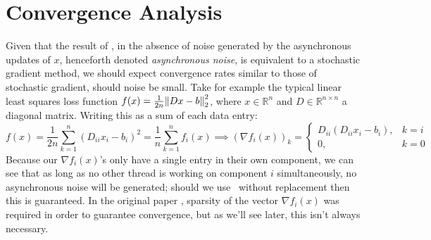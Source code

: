 \section{Convergence Analysis}

Given that the result of \hogwild, in the absence of noise generated by the
asynchronous updates of $x$, henceforth denoted {\it asynchronous noise}, is
equivalent to a stochastic gradient method, we should expect convergence rates
similar to those of stochastic gradient, should noise be small. Take for example
the typical linear least squares loss function $f(x) = \frac{1}{2n}
\norm{Dx-b}_2^2$, where $x \in \mathbb{R}^n$ and $D \in \mathbb{R}^{n \times n}$
a diagonal matrix. Writing this as a sum of each data entry:
\[
  f(x) 
  = \frac{1}{2n} \sum_{k=1}^n (D_{ii}x_i - b_i)^2
  = \frac{1}{n} \sum_{k=1}^n f_i(x)
  \implies
  (\nabla f_i(x))_k
  =
  \begin{cases}
    D_{ii}(D_{ii}x_i - b_i), & k = i \\
    0, & k = 0
  \end{cases}
\]
Because our $\nabla f_i(x)$'s only have a single entry in their own component, we
can see that as long as no other thread is working on component $i$
simultaneously, no asynchronous noise will be generated; should we use \hogwild\
without replacement then this is guaranteed. In the original paper
\cite{2011NRRW}, sparsity of the vector $\nabla f_i(x)$ was required in order to
guarantee convergence, but as we'll see later, this isn't always necessary.

